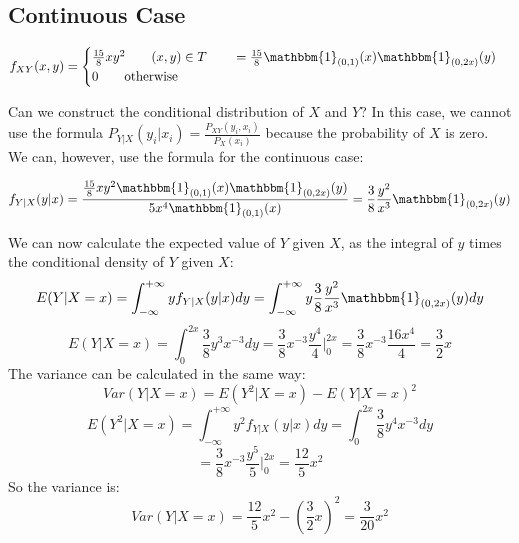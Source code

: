 \subsection*{Continuous Case}

\begin{equation*}
    f_{XY}(x,y) = \begin{cases}
        \frac{15}{8}xy^2 \qquad (x,y) \in T \qquad = \frac{15}{8} \mathbbm{1}_{(0,1)}(x) \mathbbm{1}_{(0,2x)}(y) \\
        0 \qquad \text{otherwise}
    \end{cases}
\end{equation*}

Can we construct the conditional distribution of $X$ and $Y$?
In this case, we cannot use the formula $P_{Y|X}(y_i | x_i) = \frac{P_{XY}(y_i, x_i)}{P_{X}(x_i)}$ because the probability of $X$ is zero. We can, however, use the formula for the continuous case:

\[
f_{Y|X}(y|x) = \frac{\frac{15}{8}xy^2\mathbbm{1}_{(0,1)}(x) \mathbbm{1}_{(0,2x)}(y)}{5x^4 \mathbbm{1}_{(0,1)}(x)} = \frac{3}{8}\frac{y^2}{x^3} \mathbbm{1}_{(0,2x)}(y)
\]

We can now calculate the expected value of $Y$ given $X$, as the integral of $y$ times the conditional density of $Y$ given $X$:
\[
E(Y|X = x) = \int_{-\infty}^{+\infty} y f_{Y|X}(y|x) dy = \int_{-\infty}^{+\infty} y \frac{3}{8}\frac{y^2}{x^3} \mathbbm{1}_{(0,2x)}(y) dy
\]
\[
E(Y|X = x) = \int_{0}^{2x} \frac{3}{8} y^3 x^{-3} dy = \frac{3}{8} x^{-3} \frac{y^4}{4} \Big|_{0}^{2x} = \frac{3}{8} x^{-3} \frac{16x^4}{4} = \frac{3}{2}x
\]
The variance can be calculated in the same way:
\[
Var(Y|X = x) = E(Y^2|X = x) - E(Y|X = x)^2
\]
\[
E(Y^2|X = x) = \int_{-\infty}^{+\infty} y^2 f_{Y|X}(y|x) dy = \int_{0}^{2x} \frac{3}{8} y^4 x^{-3} dy
\]
\[
= \frac{3}{8} x^{-3} \frac{y^5}{5} \Big|_{0}^{2x} = \frac{12}{5}x^2
\]
So the variance is:
\[
Var(Y|X = x) = \frac{12}{5}x^2 - \left(\frac{3}{2}x\right)^2 = \frac{3}{20}x^2
\]




